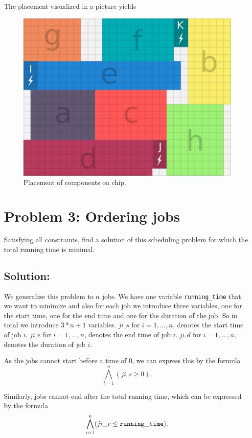 \documentclass[a4paper]{article}
\begin{document}
	The placement visualized in a picture yields
	\begin{figure}[H]
		\centering
		\includegraphics[scale=0.7]{power-grid-3.png}
		\caption{Placement of components on chip.}
	\end{figure}
	
	\section*{Problem 3: Ordering jobs}
	Satisfying all constraints, find a solution of this scheduling problem for which the total running time is minimal.


	\subsection*{Solution:}
	We generalize this problem to $n$ jobs. We have one variable {\tt running\_time} that we want to minimize and also for each job we introduce three variables, one for the start time, one for the end time and one for the duration of the job. So in total we introduce $3*n + 1$ variables. $ji\_s$ for $i = 1,\ldots,n$, denotes the start time of job $i$. $ji\_e$ for $i = 1,\ldots,n$, denotes the end time of job $i$. $ji\_d$ for $i = 1,\ldots,n$, denotes the duration of job $i$.
	
	As the jobs cannot start before a time of 0, we can express this by the formula
\[ \bigwedge_{i=1}^n (ji\_s \geq 0).\]

	Similarly, jobs cannot end after the total running time, which can be expressed by the formula
\[ \bigwedge_{i=1}^n (ji\_e \leq {\tt running\_time}).\]
\end{document}
